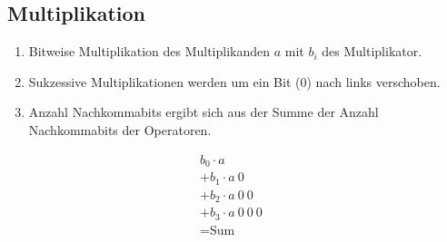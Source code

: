 \subsection{Multiplikation}
\begin{center}
    \begin{minipage}[t]{0.70\linewidth}
        \begin{enumerate}
            \item Bitweise Multiplikation des Multiplikanden $a$ mit $b_i$ des Multiplikator.
            \item Sukzessive Multiplikationen werden um ein Bit ($0$) nach links verschoben.
            \item Anzahl Nachkommabits ergibt sich aus der Summe der Anzahl Nachkommabits der Operatoren.
        \end{enumerate}
    \end{minipage}
    \hfill
    \begin{minipage}[t]{0.25\linewidth}
        \begin{align*}
            b_0 \cdot a&\\
            +b_1 \cdot a~0\\
            +b_2 \cdot a~0~0&\\
            +b_3 \cdot a~0~0~0&\\
            \hline
            =\text{Sum}&
        \end{align*}
    \end{minipage}
\end{center}

